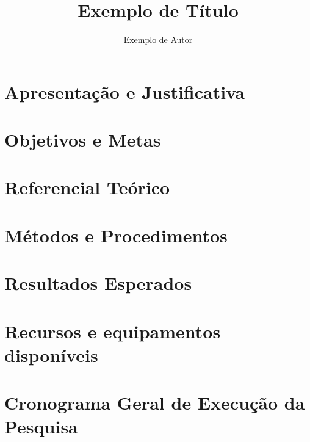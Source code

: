 \documentclass[12pt]{article}
\begin{document}
\author{Exemplo de Autor}
\title{Exemplo de Título}


\coverpage
\aboutpage

\section{Apresentação e Justificativa}
\lipsum[2-5]

\section{Objetivos e Metas}
\lipsum[2-5]

\section{Referencial Teórico}
\lipsum[2-5]

\section{Métodos e Procedimentos}
\lipsum[2-5]

\section{Resultados Esperados}
\lipsum[2-5]

\section{Recursos e equipamentos disponíveis}
\lipsum[2-5]

\section{Cronograma Geral de Execução da Pesquisa}

\end{document}
